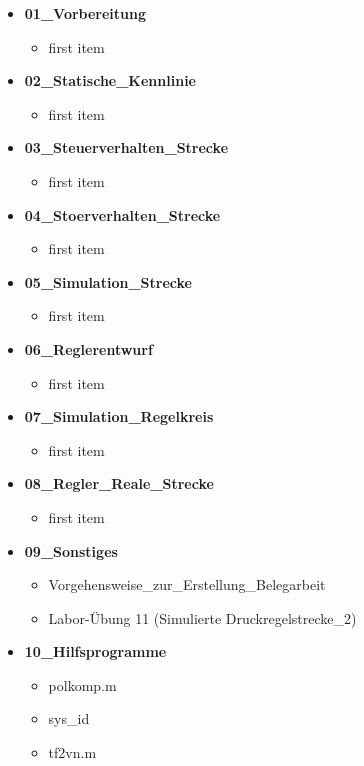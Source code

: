 \documentclass[11pt, a4paper,parskip=half]{article}
\begin{document}
\begin{itemize}
\item \textbf{01\_Vorbereitung}
	\begin{itemize}
	\item first item
	\end{itemize}
	
\item \textbf{02\_Statische\_Kennlinie}
	\begin{itemize}
	\item first item
	\end{itemize}
	
\item \textbf{03\_Steuerverhalten\_Strecke}
	\begin{itemize}
	\item first item
	\end{itemize}
	
\item \textbf{04\_Stoerverhalten\_Strecke}
	\begin{itemize}
	\item first item
	\end{itemize}
	
\item \textbf{05\_Simulation\_Strecke}
	\begin{itemize}
	\item first item
	\end{itemize}
	
\item \textbf{06\_Reglerentwurf}
	\begin{itemize}
	\item first item
	\end{itemize}
	
\item \textbf{07\_Simulation\_Regelkreis}
	\begin{itemize}
	\item first item
	\end{itemize}
	
\item \textbf{08\_Regler\_Reale\_Strecke}
	\begin{itemize}
	\item first item
	\end{itemize}
	
\item \textbf{09\_Sonstiges}
	\begin{itemize}
	\item Vorgehensweise\_zur\_Erstellung\_Belegarbeit
	\item Labor-Übung 11 (Simulierte Druckregelstrecke\_2)
	\end{itemize}
	
\item \textbf{10\_Hilfsprogramme}
	\begin{itemize}
	\item polkomp.m
	\item sys\_id
	\item tf2vn.m
	\end{itemize}

\end{itemize}
\end{document}
